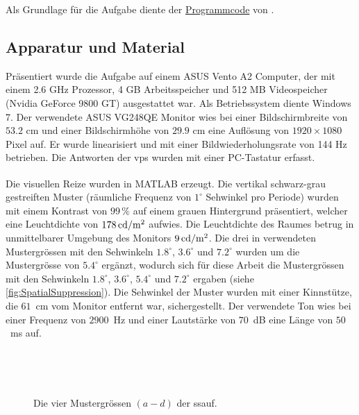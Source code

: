 \documentclass[11pt, twoside, a4paper]{book}		%
\begin{document}
Als Grundlage für die Aufgabe diente der \href{http://www.bcs.rochester.edu/people/duje/SuppressionCode.zip}{Programmcode} von \citet{Melnick2013}.

\subsection{Apparatur und Material \label{sub:ssas}}
Präsentiert wurde die Aufgabe auf einem ASUS Vento A2 Computer, der mit einem 2.6 GHz Prozessor, 4 GB Arbeitsspeicher und 512 MB Videospeicher (Nvidia GeForce 9800 GT) ausgestattet war. Als Betriebssystem diente Windows 7. Der verwendete ASUS VG248QE Monitor wies bei einer Bildschirmbreite von $53.2$ cm und einer Bildschirmhöhe von $29.9$ cm eine Auflösung von $1920 \times 1080$ Pixel auf. Er wurde linearisiert und mit einer Bildwiederholungsrate von 144 Hz betrieben. Die Antworten der \glspl{vp} wurden mit einer PC-Tastatur erfasst. 

Die visuellen Reize wurden in MATLAB\textsuperscript{\textregistered} \citep{matlab} erzeugt. Die vertikal schwarz-grau gestreiften Muster (räumliche Frequenz von $1^{\circ}$ Sehwinkel pro Periode) wurden mit einem Kontrast von $99\,\%$ auf einem grauen Hintergrund präsentiert, welcher eine Leuchtdichte von $178\,\textnormal{cd}/ \textnormal{m}^2$ aufwies. Die Leuchtdichte des Raumes betrug in unmittelbarer Umgebung des Monitors $9\,\textnormal{cd}/ \textnormal{m}^2$. Die drei in \citet{Melnick2013} verwendeten Mustergrössen mit den Sehwinkeln  $1.8^{\circ}$, $3.6^{\circ}$ und $7.2^{\circ}$ wurden um die Mustergrösse von $5.4^{\circ}$ ergänzt, wodurch sich für diese Arbeit die Mustergrössen mit den Sehwinkeln $1.8^{\circ}$, $3.6^{\circ}$, $5.4^{\circ}$ und $7.2^{\circ}$ ergaben (siehe \autoref{fig:SpatialSuppression}). 
Die Sehwinkel der Muster wurden mit einer Kinnstütze, die $61$~cm vom Monitor entfernt war, sichergestellt. 
Der verwendete Ton wies bei einer Frequenz von $2900$~Hz und einer Lautstärke von $70$~dB eine Länge von $50$~ms auf.

\begin{figure}[htb]
	\centering
	~~

	~~

	\caption[Spatial-Suppression-Bedingungen]{Die vier Mustergrössen $(a - d)$ der \gls{ssauf}.}
	\label{fig:SpatialSuppression}
\end{figure}
\end{document}
